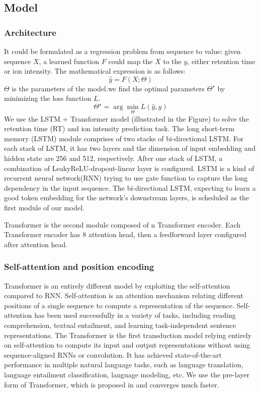 
\subsection{Model}
\subsubsection*{Architecture}
It could be formulated as a regression problem from sequence to value: given sequence \( X \), a learned
function \( F \) could map the \( X \) to the \( y \), either retention time or ion intensity. The mathematical expression is as follows:
\[ \hat{y} = F(X;\Theta) \]
$\Theta$ is the parameters of the model.we find the optimal parameters \( \Theta^\star\) by minimizing  the loss function \( L \).
\[ \Theta^\star = \arg\min_{\Theta} L(\hat{y}, y) \]
We use the LSTM + Transformer model (illustrated in the Figure) to solve the retention time (RT) and ion intensity prediction task.
The long short-term memory (LSTM)\cite{hochreiter1997long} module comprises of two stacks of bi-directional LSTM. For each stack of LSTM, it has two layers and the dimension of input embedding and hidden state are 256 and 512, respectively. After one stack of LSTM, a combination of LeakyReLU-dropout-linear layer is configured. LSTM is a kind of recurrent neural network(RNN) trying to use gate function to capture the long dependency in the input sequence. The bi-directional LSTM, expecting to learn a good token embedding for the network's downstream layers, is scheduled as the first module of our model.

Transformer\cite{vaswani2017attention} is the second module composed of n Transformer encoder.
Each Transformer encoder has 8 attention head, then a feedforward layer configured after attention head.

\subsubsection*{Self-attention and position encoding}
Transformer is an entirely different model by exploiting the self-attention compared to RNN.
Self-attention is an attention mechanism relating different positions of a single sequence to compute a representation of the sequence. Self-attention has been used successfully in a variety of tasks, including reading
comprehension, textual entailment, and learning task-independent sentence representations.
The Transformer is the first transduction model relying entirely on self-attention to compute its input and output representations without using sequence-aligned RNNs or convolution. It has achieved state-of-the-art performance in multiple natural language tasks, such as language translation, language entailment classification, language modeling, etc. We use the pre-layer form of Transformer, which is proposed in \cite{xiong2020layer} and converges much faster.

